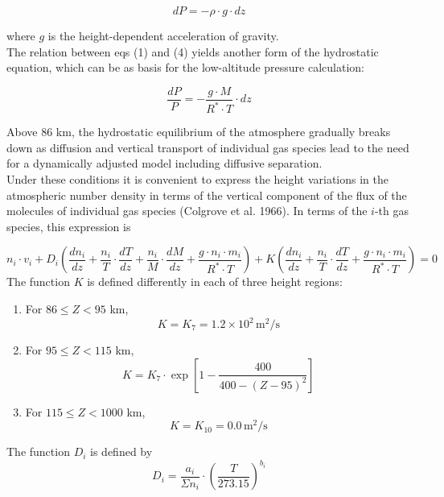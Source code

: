 \documentclass{article}
\begin{document}
\begin{equation}
    dP = -\rho \cdot g \cdot dz \tag{4}
\end{equation}

where $g$ is the height-dependent acceleration of gravity. \\
The relation between eqs (1) and (4) yields another form of the hydrostatic equation, which can be as basis for the low-altitude pressure calculation:

\begin{equation}
\frac{dP}{P} = -\frac{g \cdot M}{R^* \cdot T} \cdot dz \tag{5}
\end{equation}

Above 86 km, the hydrostatic equilibrium of the atmosphere gradually breaks down as diffusion and vertical transport of individual gas species lead to the need for a dynamically adjusted model including diffusive separation. \\
Under these conditions it is convenient to express the height variations in the atmospheric number density in terms of the vertical component of the flux of the molecules of individual gas species (Colgrove et al. 1966). In terms of the $i$-th gas species, this expression is

\begin{equation}
  n_i \cdot v_i  + D_i \left ( \frac{dn_i}{dz} + \frac{n_i}{T} \cdot \frac{dT}{dz} + \frac{n_i}{M} \cdot \frac{dM}{dz}  + \frac{g \cdot n_i \cdot m_i}{R^* \cdot T}  \right ) + K \left ( \frac{dn_i}{dz} + \frac{n_i}{T} \cdot \frac{dT}{dz}  + \frac{g \cdot n_i \cdot m_i}{R^* \cdot T} \right ) = 0 \tag{6}
\end{equation}
The function $K$ is defined differently in each of three height regions:

\begin{enumerate}
    \item For $86 \leq Z < 95$ km,
    \[
    K = K_7 = 1.2 \times 10^2 \, \text{m}^2/\text{s} \tag{7a}
    \]

    \item For $95 \leq Z < 115$ km,
    \[
    K = K_7 \cdot \exp\left[1 - \frac{400}{400 - (Z - 95)^2}\right] \tag{7b}
    \]

    \item For $115 \leq Z < 1000$ km,
    \[
    K = K_{10} = 0.0 \, \text{m}^2/\text{s} \tag{7c}
    \]
\end{enumerate}

The function $D_i$ is defined by
\[
D_i = \frac{a_i}{\Sigma n_i} \cdot \left(\frac{T}{273.15}\right)^{b_i} \tag{8}
\]
\end{document}
